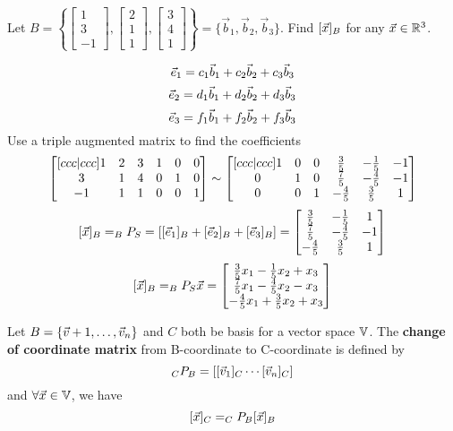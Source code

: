 \documentclass[english, 12pt]{article}
\begin{document}
\begin{exmp}
Let $B = \left\{\begin{bmatrix} 1 \\ 3 \\ -1 \end{bmatrix}, \begin{bmatrix} 2 \\ 1 \\ 1 \end{bmatrix}, \begin{bmatrix} 3 \\ 4 \\ 1 \end{bmatrix}\right\} = \{\vec{b}_1, \vec{b}_2, \vec{b}_3\}$.\n
Find $\lbrack \vec{x} \rbrack_B$ for any $\vec{x} \in {\mathbb{R}}^3$.
\begin{sol}
\[\vec{e}_1 = c_1 \vec{b}_1 + c_2 \vec{b}_2 + c_3 \vec{b}_3\]
\[\vec{e}_2 = d_1 \vec{b}_1 + d_2 \vec{b}_2 + d_3 \vec{b}_3\]
\[\vec{e}_3 = f_1 \vec{b}_1 + f_2 \vec{b}_2 + f_3 \vec{b}_3\]
Use a triple augmented matrix to find the coefficients
\[\begin{bmatrix}[ccc|ccc] 1 & 2 & 3 & 1 & 0 & 0 \\ 3 & 1 & 4 & 0 & 1 & 0 \\ -1 & 1 & 1 & 0 & 0 & 1 \end{bmatrix} \sim \begin{bmatrix}[ccc|ccc] 1 & 0 & 0 & \frac{3}{5} & - \frac{1}{5} & -1 \\ 0 & 1 & 0 & \frac{7}{5} & - \frac{4}{5} & -1 \\ 0 & 0 & 1 & - \frac{4}{5} & \frac{3}{5} & 1 \end{bmatrix}\]
\[\lbrack \vec{x} \rbrack_B = _B P_S = \left \lbrack \lbrack \vec{e}_1 \rbrack_B + \lbrack \vec{e}_2 \rbrack_B + \lbrack \vec{e}_3 \rbrack_B \right \rbrack = \begin{bmatrix} \frac{3}{5} & - \frac{1}{5} & 1 \\ \frac{7}{5} & - \frac{4}{5} & -1 \\ - \frac{4}{5} & \frac{3}{5} & 1 \end{bmatrix}\]
\[\lbrack \vec{x} \rbrack_B = _B P_S \vec{x} = \begin{bmatrix} \frac{3}{5} x_1 - \frac{1}{5} x_2 + x_3\\ \frac{7}{5} x_1 - \frac{4}{5} x_2 - x_3 \\ - \frac{4}{5} x_1 + \frac{3}{5} x_2 + x_3\end{bmatrix}\]
\end{sol}
\end{exmp}

\begin{defn}
Let $B = \{\vec{v}+1,\dots,\vec{v}_n\}$ and $C$ both be basis for a vector space ${\mathbb{V}}$. The \textbf{change of coordinate matrix} from B-coordinate to C-coordinate is defined by
\[_CP_B = \lbrack \lbrack \vec{v}_1 \rbrack_C \cdots \lbrack \vec{v}_n \rbrack_C \rbrack\]
and $\forall \vec{x} \in {\mathbb{V}}$, we have
\[\lbrack \vec{x} \rbrack_C = _CP_B \lbrack \vec{x} \rbrack_B\]
\end{defn}
\end{document}
